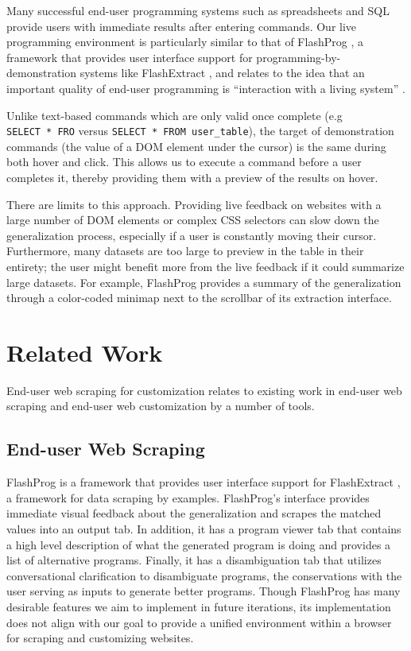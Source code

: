 \documentclass[sigconf,10pt]{acmart}
\begin{document}
Many successful end-user programming systems such as spreadsheets and
SQL provide users with immediate results after entering commands. Our
live programming environment is particularly similar to that of
FlashProg \citep{mayer2015}, a framework that provides user interface
support for programming-by-demonstration systems like FlashExtract
\citep{le2014}, and relates to the idea that an important quality of
end-user programming is ``interaction with a living system''
\citep{zotero-60}.

Unlike text-based commands which are only valid once complete (e.g
\texttt{SELECT\ *\ FRO} versus \texttt{SELECT\ *\ FROM\ user\_table}),
the target of demonstration commands (the value of a DOM element under
the cursor) is the same during both hover and click. This allows us to
execute a command before a user completes it, thereby providing them
with a preview of the results on hover.

There are limits to this approach. Providing live feedback on websites
with a large number of DOM elements or complex CSS selectors can slow
down the generalization process, especially if a user is constantly
moving their cursor. Furthermore, many datasets are too large to preview
in the table in their entirety; the user might benefit more from the
live feedback if it could summarize large datasets. For example,
FlashProg provides a summary of the generalization through a color-coded
minimap next to the scrollbar of its extraction interface.

\hypertarget{sec:related-work}{%
\section{Related Work}\label{sec:related-work}}

End-user web scraping for customization relates to existing work in
end-user web scraping and end-user web customization by a number of
tools.

\hypertarget{end-user-web-scraping}{%
\subsection{End-user Web Scraping}\label{end-user-web-scraping}}

FlashProg \citep{mayer2015} is a framework that provides user interface
support for FlashExtract \citep{le2014}, a framework for data scraping
by examples. FlashProg's interface provides immediate visual feedback
about the generalization and scrapes the matched values into an output
tab. In addition, it has a program viewer tab that contains a high level
description of what the generated program is doing and provides a list
of alternative programs. Finally, it has a disambiguation tab that
utilizes conversational clarification to disambiguate programs, the
conservations with the user serving as inputs to generate better
programs. Though FlashProg has many desirable features we aim to
implement in future iterations, its implementation does not align with
our goal to provide a unified environment within a browser for scraping
and customizing websites.
\end{document}
